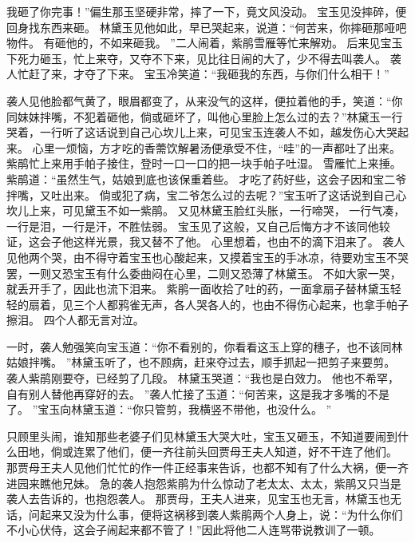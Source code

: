 我砸了你完事！”偏生那玉坚硬非常，摔了一下，竟文风没动。
宝玉见没摔碎，便回身找东西来砸。
林黛玉见他如此，早已哭起来，说道：“何苦来，你摔砸那哑吧物件。
有砸他的，不如来砸我。
”二人闹着，紫鹃雪雁等忙来解劝。
后来见宝玉下死力砸玉，忙上来夺，又夺不下来，见比往日闹的大了，少不得去叫袭人。
袭人忙赶了来，才夺了下来。
宝玉冷笑道：“我砸我的东西，与你们什么相干！”\par
袭人见他脸都气黄了，眼眉都变了，从来没气的这样，便拉着他的手，笑道：“你同妹妹拌嘴，不犯着砸他，倘或砸坏了，叫他心里脸上怎么过的去？”林黛玉一行哭着，一行听了这话说到自己心坎儿上来，可见宝玉连袭人不如，越发伤心大哭起来。
心里一烦恼，方才吃的香薷饮解暑汤便承受不住，“哇”的一声都吐了出来。
紫鹃忙上来用手帕子接住，登时一口一口的把一块手帕子吐湿。
雪雁忙上来捶。
紫鹃道：“虽然生气，姑娘到底也该保重着些。
才吃了药好些，这会子因和宝二爷拌嘴，又吐出来。
倘或犯了病，宝二爷怎么过的去呢？”宝玉听了这话说到自己心坎儿上来，可见黛玉不如一紫鹃。
又见林黛玉脸红头胀，一行啼哭，
一行气凑，
一行是泪，一行是汗，不胜怯弱。
宝玉见了这般，又自己后悔方才不该同他较证，这会子他这样光景，我又替不了他。
心里想着，也由不的滴下泪来了。
袭人见他两个哭，由不得守着宝玉也心酸起来，又摸着宝玉的手冰凉，待要劝宝玉不哭罢，一则又恐宝玉有什么委曲闷在心里，二则又恐薄了林黛玉。
不如大家一哭，就丢开手了，因此也流下泪来。
紫鹃一面收拾了吐的药，一面拿扇子替林黛玉轻轻的扇着，见三个人都鸦雀无声，各人哭各人的，也由不得伤心起来，也拿手帕子擦泪。
四个人都无言对泣。
\par
一时，袭人勉强笑向宝玉道：“你不看别的，你看看这玉上穿的穗子，也不该同林姑娘拌嘴。
”林黛玉听了，也不顾病，赶来夺过去，顺手抓起一把剪子来要剪。
袭人紫鹃刚要夺，已经剪了几段。
林黛玉哭道：“我也是白效力。
他也不希罕，自有别人替他再穿好的去。
”袭人忙接了玉道：“何苦来，这是我才多嘴的不是了。
”宝玉向林黛玉道：“你只管剪，我横竖不带他，也没什么。
”\par
只顾里头闹，谁知那些老婆子们见林黛玉大哭大吐，宝玉又砸玉，不知道要闹到什么田地，倘或连累了他们，便一齐往前头回贾母王夫人知道，好不干连了他们。
那贾母王夫人见他们忙忙的作一件正经事来告诉，也都不知有了什么大祸，便一齐进园来瞧他兄妹。
急的袭人抱怨紫鹃为什么惊动了老太太、太太，紫鹃又只当是袭人去告诉的，也抱怨袭人。
那贾母，王夫人进来，见宝玉也无言，林黛玉也无话，问起来又没为什么事，便将这祸移到袭人紫鹃两个人身上，说：“为什么你们不小心伏侍，这会子闹起来都不管了！”因此将他二人连骂带说教训了一顿。
